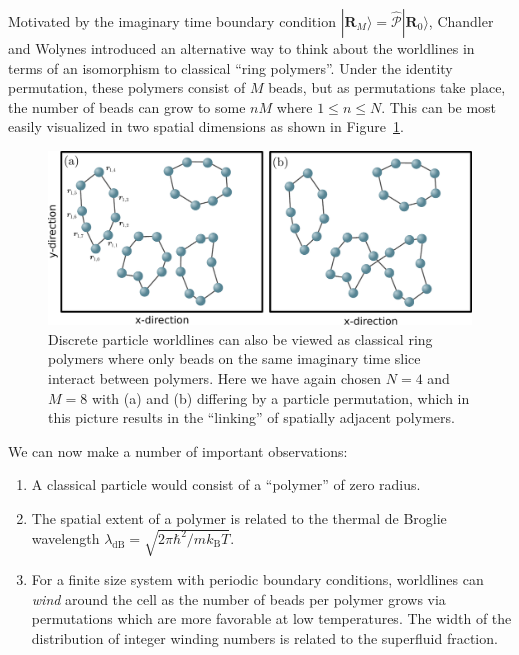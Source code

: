 \documentclass[prb,10pt,aps,floatfix,notitlepage]{revtex4-1}
\renewcommand{\vec}[1]{\boldsymbol{#1}}
\newcommand{\R}{\vec{R}}
\begin{document}
Motivated by the imaginary time boundary condition $|\R_M\rangle =
\hat{\mathcal{P}}|\R_0\rangle$, Chandler and Wolynes \cite{Chandler:1981gz}
introduced an alternative way to think about the worldlines in terms of an
isomorphism to classical ``ring polymers''.  Under the identity permutation,
these polymers consist of $M$ beads, but as permutations take place, the number
of beads can grow to some $n M$ where $1 \le n \le N$. This can be most easily
visualized in two spatial dimensions as shown in Figure~\ref{fig:polymers}.
%
\begin{figure}
\begin{center}
\includegraphics[width=0.75\columnwidth]{Figures/polymers.pdf}
\end{center}
\caption{Discrete particle worldlines can also be viewed as classical ring
    polymers where only beads on the same imaginary time slice interact between
    polymers.  Here we have again chosen $N=4$ and $M=8$ with (a) and (b)
    differing by a particle permutation, which in this picture results in the
``linking'' of spatially adjacent polymers.}
\label{fig:polymers}
 \end{figure}
%
We can now make a number of important observations:
\begin{enumerate}
    \item A classical particle would consist of a ``polymer'' of zero radius.
    \item The spatial extent of a polymer is related to the thermal de Broglie
    wavelength $\lambda_{\mathrm{dB}} = \sqrt{2\pi \hbar^2 / m k_\mathrm{B} T
    }$.
\item For a finite size system with periodic boundary conditions, worldlines
    can \emph{wind} around the cell as the number of beads per polymer grows
    via permutations which are more favorable at low temperatures.  The width
    of the distribution of integer winding numbers is related to the superfluid
    fraction.
\end{enumerate}
\end{document}
